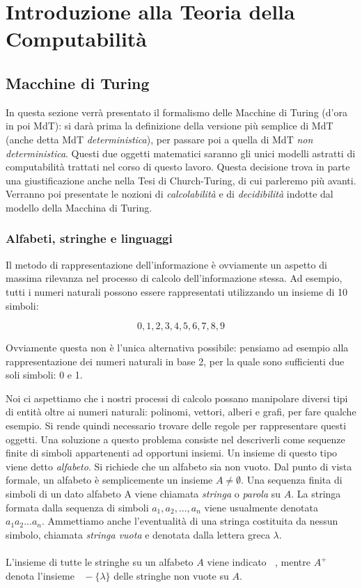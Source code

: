 \documentclass[12pt,a4paper]{report}
\theoremstyle{definition}
\DeclareMathOperator{\aaa}{\textit{A}^{\star}}
\begin{document}
\chapter{Introduzione alla Teoria della Computabilità}

\section{Macchine di Turing}

In questa sezione verrà presentato il formalismo delle Macchine di Turing (d'ora in poi MdT): si darà prima la definizione della versione più semplice di MdT (anche detta MdT \emph{deterministica}), per passare poi a quella di MdT \emph{non deterministica}. Questi due oggetti matematici saranno gli unici modelli astratti di computabilità trattati nel corso di questo lavoro. Questa decisione trova in parte una giustificazione anche nella Tesi di Church-Turing, di cui parleremo più avanti.
Verranno poi presentate le nozioni di \emph{calcolabilità} e di \emph{decidibilità} indotte dal modello della Macchina di Turing.


\subsection{Alfabeti, stringhe e linguaggi}

Il metodo di rappresentazione dell'informazione è ovviamente un aspetto di massima rilevanza nel processo di calcolo dell'informazione stessa. Ad esempio, tutti i numeri naturali possono essere rappresentati utilizzando un insieme di 10 simboli:

$$0,1,2,3,4,5,6,7,8,9$$

Ovviamente questa non è l'unica alternativa possibile: pensiamo ad esempio alla rappresentazione dei numeri naturali in base 2, per la quale sono sufficienti due soli simboli: 0 e 1.

Noi ci aspettiamo che i nostri processi di calcolo possano manipolare diversi tipi di entità oltre ai numeri naturali: polinomi, vettori, alberi e grafi, per fare qualche esempio. Si rende quindi necessario trovare delle regole per rappresentare questi oggetti. Una soluzione a questo problema consiste nel descriverli come sequenze finite di simboli appartenenti ad opportuni insiemi. Un insieme di questo tipo viene detto \emph{alfabeto}. Si richiede che un alfabeto sia non vuoto. Dal punto di vista formale, un alfabeto è semplicemente un insieme $A \neq \emptyset$.
Una sequenza finita di simboli di un dato alfabeto A viene chiamata \emph{stringa} o \emph{parola} su $A$. La stringa formata dalla sequenza di simboli $a_1,a_2,...,a_n$ viene usualmente denotata $a_1 a_2 ... a_n$. Ammettiamo anche l'eventualità di una stringa costituita da nessun simbolo, chiamata \emph{stringa vuota} e denotata dalla lettera greca $\lambda$.\\
\\
L'insieme di tutte le stringhe su un alfabeto $A$ viene indicato $\aaa$, mentre $A^+$ denota l'insieme $\aaa-\{\lambda\}$ delle stringhe non vuote su $A$.
\end{document}
